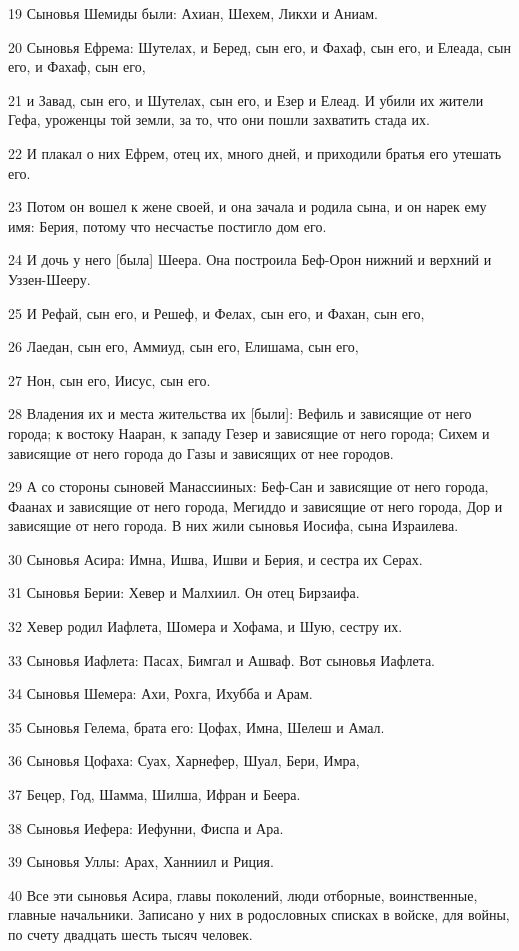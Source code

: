 \par 19 Сыновья Шемиды были: Ахиан, Шехем, Ликхи и Аниам.
\par 20 Сыновья Ефрема: Шутелах, и Беред, сын его, и Фахаф, сын его, и Елеада, сын его, и Фахаф, сын его,
\par 21 и Завад, сын его, и Шутелах, сын его, и Езер и Елеад. И убили их жители Гефа, уроженцы той земли, за то, что они пошли захватить стада их.
\par 22 И плакал о них Ефрем, отец их, много дней, и приходили братья его утешать его.
\par 23 Потом он вошел к жене своей, и она зачала и родила сына, и он нарек ему имя: Берия, потому что несчастье постигло дом его.
\par 24 И дочь у него [была] Шеера. Она построила Беф-Орон нижний и верхний и Уззен-Шееру.
\par 25 И Рефай, сын его, и Решеф, и Фелах, сын его, и Фахан, сын его,
\par 26 Лаедан, сын его, Аммиуд, сын его, Елишама, сын его,
\par 27 Нон, сын его, Иисус, сын его.
\par 28 Владения их и места жительства их [были]: Вефиль и зависящие от него города; к востоку Нааран, к западу Гезер и зависящие от него города; Сихем и зависящие от него города до Газы и зависящих от нее городов.
\par 29 А со стороны сыновей Манассииных: Беф-Сан и зависящие от него города, Фаанах и зависящие от него города, Мегиддо и зависящие от него города, Дор и зависящие от него города. В них жили сыновья Иосифа, сына Израилева.
\par 30 Сыновья Асира: Имна, Ишва, Ишви и Берия, и сестра их Серах.
\par 31 Сыновья Берии: Хевер и Малхиил. Он отец Бирзаифа.
\par 32 Хевер родил Иафлета, Шомера и Хофама, и Шую, сестру их.
\par 33 Сыновья Иафлета: Пасах, Бимгал и Ашваф. Вот сыновья Иафлета.
\par 34 Сыновья Шемера: Ахи, Рохга, Ихубба и Арам.
\par 35 Сыновья Гелема, брата его: Цофах, Имна, Шелеш и Амал.
\par 36 Сыновья Цофаха: Суах, Харнефер, Шуал, Бери, Имра,
\par 37 Бецер, Год, Шамма, Шилша, Ифран и Беера.
\par 38 Сыновья Иефера: Иефунни, Фиспа и Ара.
\par 39 Сыновья Уллы: Арах, Ханниил и Риция.
\par 40 Все эти сыновья Асира, главы поколений, люди отборные, воинственные, главные начальники. Записано у них в родословных списках в войске, для войны, по счету двадцать шесть тысяч человек.


